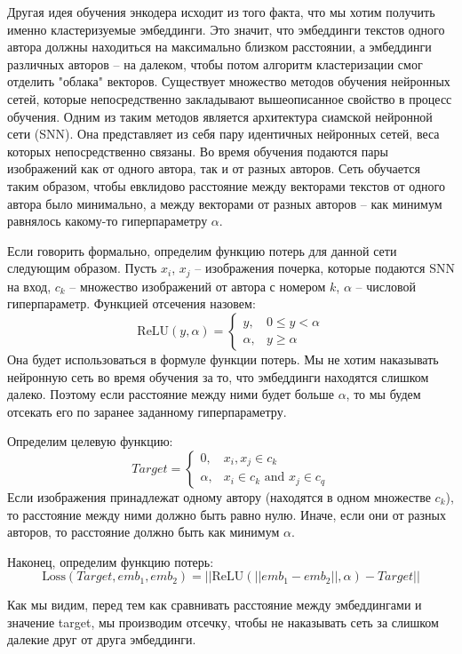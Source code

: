 Другая идея обучения энкодера исходит из того факта, что мы хотим получить именно кластеризуемые эмбеддинги. Это значит, что эмбеддинги текстов одного автора должны находиться на максимально близком расстоянии, а эмбеддинги различных авторов -- на далеком, чтобы потом алгоритм кластеризации смог отделить "облака" векторов. Существует множество методов обучения нейронных сетей, которые непосредственно закладывают вышеописанное свойство в процесс обучения. Одним из таким методов является архитектура сиамской нейронной сети (SNN). Она представляет из себя пару идентичных нейронных сетей, веса которых непосредственно связаны. Во время обучения подаются пары изображений как от одного автора, так и от разных авторов. Сеть обучается таким образом, чтобы евклидово расстояние между векторами текстов от одного автора было минимально, а между векторами от разных авторов -- как минимум равнялось какому-то гиперпараметру $\alpha$. 

Если говорить формально, определим функцию потерь для данной сети следующим образом. Пусть
$x_i$, $x_j$ -- изображения почерка, которые подаются SNN на вход, $c_k$ -- множество изображений от автора с номером $k$, $\alpha$ -- числовой гиперпараметр. Функцией отсечения назовем: 
$$
    \text{ReLU}(y, \alpha) = 
\begin{cases}
    y,& 0 \le y < \alpha \\
    \alpha,& y \geq \alpha
\end{cases}
$$
Она будет использоваться в формуле функции потерь. Мы не хотим наказывать нейронную сеть во время обучения за то, что эмбеддинги находятся слишком далеко. Поэтому если расстояние между ними будет больше $\alpha$, то мы будем отсекать его по заранее заданному гиперпараметру. 

\noindent
Определим целевую функцию:
$$
Target =
\begin{cases}
    0,& x_i, x_j \in c_k \\
    \alpha,& x_i \in c_k \text{ and } x_j \in c_q
\end{cases}
$$
Если изображения принадлежат одному автору (находятся в одном множестве $c_k$), то расстояние между ними должно быть равно нулю. Иначе, если они от разных авторов, то расстояние должно быть как минимум $\alpha$. 

\noindent
Наконец, определим функцию потерь:
$$\text{Loss}(Target, emb_1, emb_2) = ||\text{ReLU}(|| emb_1 - emb_2 ||, \alpha) - Target||$$

\noindent
Как мы видим, перед тем как сравнивать расстояние между эмбеддингами и значение target, мы производим отсечку, чтобы не наказывать сеть за слишком далекие друг от друга эмбеддинги.

